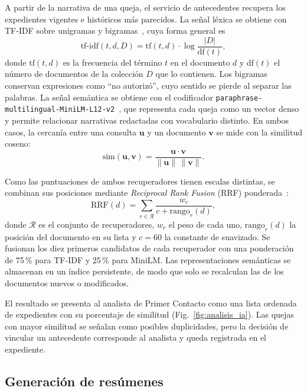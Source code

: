 \documentclass[conference,letterpaper]{IEEEtran}
\begin{document}
A partir de la narrativa de una queja, el servicio de antecedentes recupera los expedientes vigentes e históricos más parecidos. La señal léxica se obtiene con TF-IDF sobre unigramas y bigramas~\cite{manning}, cuya forma general es
\begin{equation}
\text{tf-idf}(t,d,D)=\text{tf}(t,d)\cdot\log\frac{|D|}{\text{df}(t)},
\end{equation}
donde $\text{tf}(t,d)$ es la frecuencia del término $t$ en el documento $d$ y $\text{df}(t)$ el número de documentos de la colección $D$ que lo contienen. Los bigramas conservan expresiones como ``no autorizó'', cuyo sentido se pierde al separar las palabras. La señal semántica se obtiene con el codificador \texttt{paraphrase-multilingual-MiniLM-L12-v2}~\cite{reimers,minilm,hf_minilm}, que representa cada queja como un vector denso y permite relacionar narrativas redactadas con vocabulario distinto. En ambos casos, la cercanía entre una consulta $\mathbf{u}$ y un documento $\mathbf{v}$ se mide con la similitud coseno:
\begin{equation}
\text{sim}(\mathbf{u},\mathbf{v})=\frac{\mathbf{u}\cdot\mathbf{v}}{\lVert\mathbf{u}\rVert\,\lVert\mathbf{v}\rVert}.
\end{equation}

Como las puntuaciones de ambos recuperadores tienen escalas distintas, se combinan sus posiciones mediante \textit{Reciprocal Rank Fusion} (RRF) ponderada~\cite{rrf}:
\begin{equation}
\text{RRF}(d)=\sum_{r\in\mathcal{R}}\frac{w_r}{c+\text{rango}_r(d)},
\end{equation}
donde $\mathcal{R}$ es el conjunto de recuperadores, $w_r$ el peso de cada uno, $\text{rango}_r(d)$ la posición del documento en su lista y $c=60$ la constante de suavizado. Se fusionan los diez primeros candidatos de cada recuperador con una ponderación de 75\,\% para TF-IDF y 25\,\% para MiniLM. Las representaciones semánticas se almacenan en un índice persistente, de modo que solo se recalculan las de los documentos nuevos o modificados.

El resultado se presenta al analista de Primer Contacto como una lista ordenada de expedientes con su porcentaje de similitud (Fig.~\ref{fig:analisis_ia}). Las quejas con mayor similitud se señalan como posibles duplicidades, pero la decisión de vincular un antecedente corresponde al analista y queda registrada en el expediente.

\subsection{Generación de resúmenes}
\end{document}
